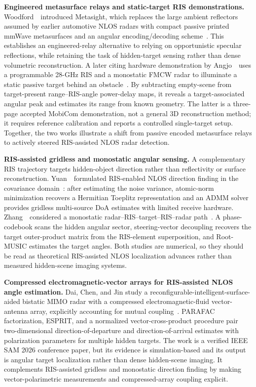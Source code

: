 \vspace{0.8mm}
\noindent \textbf{Engineered metasurface relays and static-target RIS demonstrations.}
Woodford~\etal~introduced Metasight, which replaces the large ambient reflectors assumed by earlier automotive NLOS radars with compact passive printed mmWave metasurfaces and an angular encoding/decoding scheme~\cite{woodfordMetasight2023}. This establishes an engineered-relay alternative to relying on opportunistic specular reflections, while retaining the task of hidden-target sensing rather than dense volumetric reconstruction. A later citing hardware demonstration by Angjo~\etal~uses a programmable 28-GHz RIS and a monostatic FMCW radar to illuminate a static passive target behind an obstacle~\cite{angjoRISDemo2026}. By subtracting empty-scene from target-present range--RIS-angle power-delay maps, it reveals a target-associated angular peak and estimates its range from known geometry. The latter is a three-page accepted MobiCom demonstration, not a general 3D reconstruction method; it requires reference calibration and reports a controlled single-target setup. Together, the two works illustrate a shift from passive encoded metasurface relays to actively steered RIS-assisted NLOS radar detection.

\vspace{0.8mm}
\noindent \textbf{RIS-assisted gridless and monostatic angular sensing.}
A complementary RIS trajectory targets hidden-object direction rather than reflectivity or surface reconstruction. Yuan~\etal~formulated RIS-enabled NLOS direction finding in the covariance domain~\cite{yuanRISGridlessDoA2025}: after estimating the noise variance, atomic-norm minimization recovers a Hermitian Toeplitz representation and an ADMM solver provides gridless multi-source DoA estimates with limited receive hardware. Zhang~\etal~considered a monostatic radar--RIS--target--RIS--radar path~\cite{zhangRISMonostaticDOA2026}. A phase-codebook scans the hidden angular sector, steering-vector decoupling recovers the target outer-product matrix from the RIS-element superposition, and Root-MUSIC estimates the target angles. Both studies are numerical, so they should be read as theoretical RIS-assisted NLOS localization advances rather than measured hidden-scene imaging systems.

\vspace{0.8mm}
\noindent \textbf{Compressed electromagnetic-vector arrays for RIS-assisted NLOS angle estimation.}
Dai, Chen, and Jin study a reconfigurable-intelligent-surface-aided bistatic MIMO radar with a compressed electromagnetic-fluid vector-antenna array, explicitly accounting for mutual coupling~\cite{daiRISScalableFluidVectorNLOS2026}. PARAFAC factorization, ESPRIT, and a normalized vector-cross-product procedure pair two-dimensional direction-of-departure and direction-of-arrival estimates with polarization parameters for multiple hidden targets. The work is a verified IEEE SAM 2026 conference paper, but its evidence is simulation-based and its output is angular target localization rather than dense hidden-scene imaging. It complements RIS-assisted gridless and monostatic direction finding by making vector-polarimetric measurements and compressed-array coupling explicit.

